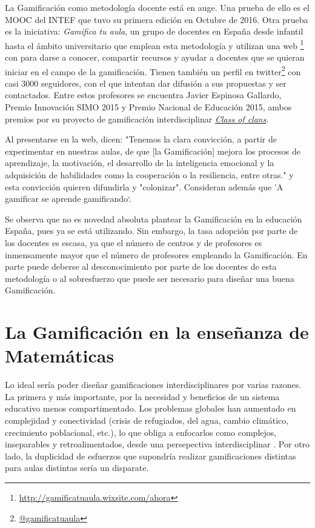 La Gamificación como metodología docente está en auge. 
%
Una prueba de ello es el \gls{MOOC} del \gls{INTEF} que tuvo su primera edición en Octubre de 2016.
%
Otra prueba es la iniciativa: \textit{Gamifica tu aula}, un grupo de docentes en España desde infantil hasta el ámbito universitario que emplean esta metodología y utilizan una web \footnote{\url{http://gamificatuaula.wixsite.com/ahora}} con para darse a conocer, compartir recursos y ayudar a docentes que se quieran iniciar en el campo de la gamificación.
%
Tienen también un perfil en twitter\footnote{\href{https://twitter.com/gamificatuaula}{@gamificatuaula}} con casi 3000 seguidores, con el que intentan dar difusión a sus propuestas y ser contactados.
%
Entre estos profesores se encuentra Javier Espinosa Gallardo, Premio Innovación SIMO 2015 y Premio Nacional de Educación 2015, ambos premios por su proyecto de gamificación interdisciplinar \href{http://jespinosag.wixsite.com/classofclans}{\textit{Class of clans}}.

Al presentarse en la web, dicen:
%
"Tenemos la clara convicción, a partir de experimentar en nuestras aulas, de que [la Gamificación] mejora los procesos de aprendizaje, la motivación, el desarrollo de la inteligencia emocional y la adquisición de habilidades como la cooperación o la resiliencia, entre otras." 
%
y esta convicción quieren difundirla y "colonizar".
%
Consideran además que ’A gamificar se aprende gamificando‘.

Se observa que no es novedad absoluta plantear la Gamificación en la educación España, pues ya se está utilizando.
%
Sin embargo, la tasa adopción por parte de los docentes es escasa, ya que el número de centros y de profesores es inmensamente mayor que el número de profesores empleando la Gamificación.
%
En parte puede deberse al desconocimiento por parte de los docentes de esta metodología o al sobresfuerzo que puede ser necesario para diseñar una buena Gamificación.

\section{La Gamificación en la enseñanza de Matemáticas}

Lo ideal sería poder diseñar gamificaciones interdisciplinares por varias razones.
%
La primera y más importante, por la necesidad y beneficios de un sistema educativo menos compartimentado. 
%
Los problemas globales han aumentado en complejidad y conectividad (crisis de refugiados, del agua, cambio climático, crecimiento poblacional, etc.), lo que obliga a enfocarlos como complejos, inseparables y retroalimentados, desde una persepectiva interdisciplinar \citep{Interdiscip}.
%
Por otro lado, la duplicidad de esfuerzos que supondría realizar gamificaciones distintas para aulas distintas sería un disparate.

